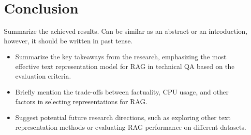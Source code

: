 
\chapter{Conclusion\label{chap:conclusion}}

Summarize the achieved results.
Can be similar as an abstract or an introduction, however, it should be written in past tense.

\begin{itemize}
    \item Summarize the key takeaways from the research, emphasizing the most effective text representation model for RAG in technical QA based on the evaluation criteria.
    \item Briefly mention the trade-offs between factuality, CPU usage, and other factors in selecting representations for RAG.
    \item Suggest potential future research directions, such as exploring other text representation methods or evaluating RAG performance on different datasets.
\end{itemize}




